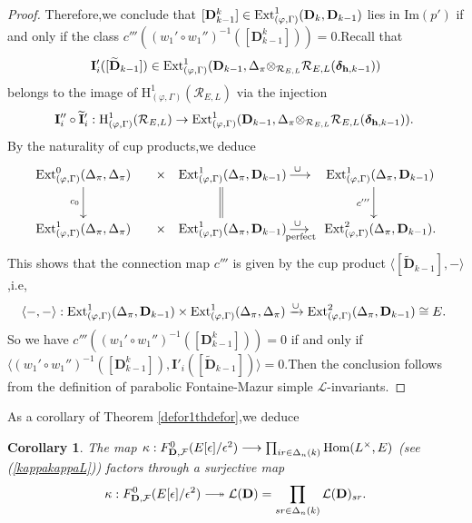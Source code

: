 \documentclass[SecEq,CM,GP]{degruyter-crelle} %
\theoremstyle{plain}
\newtheorem{cor}[thm]{Corollary}
\newcommand{\twoheadlongrightarrow}{\relbar\joinrel\twoheadrightarrow}
\newcommand{\Dpik}{{\mathbf{D}}}
\newcommand{\ext}{{\rm Ext}}
\newcommand{\homo}{{\rm Hom}}
\newcommand{\hH}{{\mathrm{H}}}
\newcommand{\tee}{{{\otimes}_{\cR_{E,L}}}}
\newcommand{\bh}{{\mathbf{h}}}
\newcommand{\cR}{\mathcal R}
\newcommand{\cF}{\mathcal F}
\newcommand{\sL}{\mathcal L}
\begin{document}
\begin{proof}
Therefore,\;we conclude that $[\Dpik^k_{k-1}]\in \ext^1_{(\varphi,\Gamma)}(\Dpik_k,\Dpik_{k-1})$ lies in $\mathrm{Im}(p')$ if and only if the class $c'''((w_1'\circ w_1'')^{-1}([\Dpik^k_{k-1}]))=0$.\;Recall that 
$$\mathbf{I}'_{i}([\widetilde{\Dpik}_{k-1}])\in \ext^1_{(\varphi,\Gamma)}(\Dpik_{k-1},\Delta_{\pi}\tee \cR_{E,L}(\bm{\delta}_{\bh,k-1}))$$ belongs to the image of $\hH^1_{(\varphi,\Gamma)}(\cR_{E,L})$ via the injection $$ {\mathbf{I}}''_{i}\circ  \widetilde{\mathbf{I}}'_{i}: \hH^1_{(\varphi,\Gamma)}(\cR_{E,L}) \rightarrow  \ext^1_{(\varphi,\Gamma)}(\Dpik_{k-1},\Delta_{\pi}\tee \cR_{E,L}(\bm{\delta}_{\bh,k-1})).\;$$
By the naturality of cup products,\;we deduce
\[\xymatrix@C=3.2ex{
	\ext^0_{(\varphi,\Gamma)}(\Delta_{\pi},\Delta_{\pi}) \ar[d]_{c_0}  & \times \hspace{10pt}\ext^1_{(\varphi,\Gamma)}(\Delta_{\pi},\Dpik_{k-1}) \ar@{=}[d]  \ar[r]^{\cup} & \hspace{10pt}\ext^1_{(\varphi,\Gamma)}(\Delta_{\pi},\Dpik_{k-1}) \ar[d]_{c'''}\\
	\ext^1_{(\varphi,\Gamma)}(\Delta_{\pi},\Delta_{\pi})   & \times \hspace{10pt} \ext^1_{(\varphi,\Gamma)}(\Delta_{\pi},\Dpik_{k-1})  \ar[r]^{\cup}_{\hspace{5pt}\text{perfect}} & \hspace{10pt}\ext^2_{(\varphi,\Gamma)}(\Delta_{\pi},\Dpik_{k-1}) .}\]
This shows that the connection map $c'''$  is given by the cup product $\langle [\widetilde{\Dpik}_{k-1}],-\rangle$,\;i.e,\;
\[\langle-,-\rangle:\ext^1_{(\varphi,\Gamma)}(\Delta_{\pi},\Dpik_{k-1})\times \ext^1_{(\varphi,\Gamma)}({\Delta_\pi},{\Delta_\pi})\xrightarrow{\cup}\ext^2_{(\varphi,\Gamma)}(\Delta_{\pi},\Dpik_{k-1})\cong E.\;\]
So we have $c'''((w_1'\circ w_1'')^{-1}([\Dpik^k_{k-1}]))=0$ if and only if $\langle(w_1'\circ w_1'')^{-1}([\Dpik^k_{k-1}]),\mathbf{I}'_{i}([\widetilde{\Dpik}_{k-1}])\rangle=0$.\;Then the conclusion  follows from the definition of parabolic Fontaine-Mazur simple $\sL$-invariants.\;
\end{proof}

As a corollary of Theorem \ref{defor1thdefor},\;we deduce

\begin{cor}\label{corlinvaraint}The map $\kappa:F_{\Dpik,\cF}^0(E[\epsilon]/\epsilon^2)\longrightarrow \prod_{ir\in \Delta_n(k)}\homo(L^\times,E)$  (see (\ref{kappakappaL})) factors through a surjective map
$$\kappa:F_{\Dpik,\cF}^0(E[\epsilon]/\epsilon^2)\twoheadlongrightarrow \sL(\Dpik)=\prod_{sr\in \Delta_n(k)}\sL(\Dpik)_{sr}.$$
\end{cor}
\end{document}
